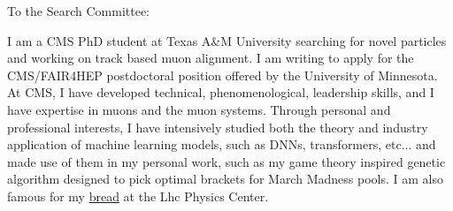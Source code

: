 \documentclass[11pt]{article}
\begin{document}




\bigskip

To the Search Committee: 

I am a CMS PhD student at Texas A\&M University searching for novel particles and working on track based muon alignment. I am writing to apply for the CMS/FAIR4HEP postdoctoral position offered by the University of Minnesota. At CMS, I have developed technical, phenomenological, leadership skills, and I have expertise in muons and the muon systems. Through personal and professional interests, I have intensively studied both the theory and industry application of machine learning models, such as DNNs, transformers, etc... and made use of them in my personal work, such as my game theory inspired genetic algorithm designed to pick optimal brackets for March Madness pools. I am also famous for my \href{https://www.symmetrymagazine.org/article/the-sourdough-starter-physics-family}{bread} at the Lhc Physics Center. 
\end{document}
